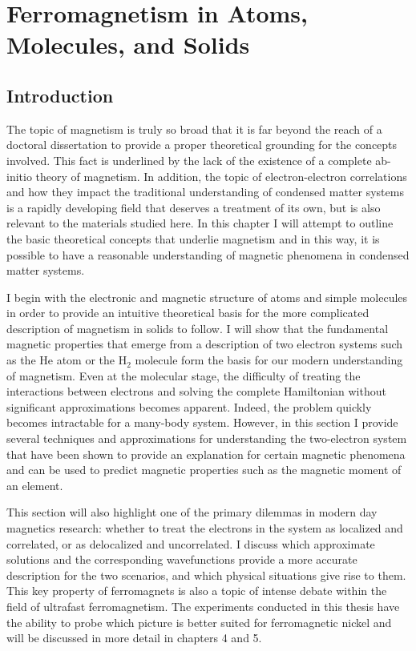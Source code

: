 \chapter{Ferromagnetism in Atoms, Molecules, and Solids}

\section{Introduction}
The topic of magnetism is truly so broad that it is far beyond the reach of a doctoral dissertation to provide a proper theoretical grounding for the concepts involved. This fact is underlined by the lack of the existence of a complete ab-initio theory of magnetism. In addition, the topic of electron-electron correlations and how they impact the traditional understanding of condensed matter systems is a rapidly developing field that deserves a treatment of its own, but is also relevant to the materials studied here. In this chapter I will attempt to outline the basic theoretical concepts that underlie magnetism and in this way, it is possible to have a reasonable understanding of magnetic phenomena in condensed matter systems.

I begin with the electronic and magnetic structure of atoms and simple molecules in order to provide an intuitive theoretical basis for the more complicated description of magnetism in solids to follow. I will show that the fundamental magnetic properties that emerge from a description of two electron systems such as the He atom or the H$_2$ molecule form the basis for our modern understanding of magnetism. Even at the molecular stage, the difficulty of treating the interactions between electrons and solving the complete Hamiltonian without significant approximations becomes apparent. Indeed, the problem quickly becomes intractable for a many-body system. However, in this section I provide several techniques and approximations for understanding the two-electron system that have been shown to provide an explanation for certain magnetic phenomena and can be used to predict magnetic properties such as the magnetic moment of an element.

This section will also highlight one of the primary dilemmas in modern day magnetics research: whether to treat the electrons in the system as localized and correlated, or as delocalized and uncorrelated. I discuss which approximate solutions and the corresponding wavefunctions provide a more accurate description for the two scenarios, and which physical situations give rise to them. This key property of ferromagnets is also a topic of intense debate within the field of ultrafast ferromagnetism. The experiments conducted in this thesis have the ability to probe which picture is better suited for ferromagnetic nickel and will be discussed in more detail in chapters 4 and 5.

